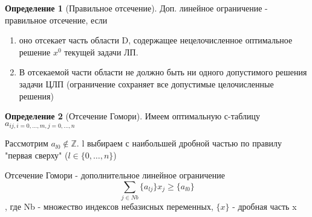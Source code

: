 \documentclass[a4paper]{article}
\theoremstyle{definition}
\newtheorem*{definition}{Определение}
\theoremstyle{remark}
\begin{document}
\begin{definition}[Правильное отсечение]
	Доп. линейное ограничение - правильное отсечение, если
	\begin{enumerate}
		\item оно отсекает часть области D, содержащее нецелочисленное оптимальное решение $x^0$ текущей задачи ЛП.
		\item В отсекаемой части области не должно быть ни одного допустимого решения задачи ЦЛП (ограничение сохраняет все допустимые целочисленные решения)
	\end{enumerate}
\end{definition}
\begin{definition}[Отсечение Гомори]
	Имеем оптимальную с-таблицу $a_{ij, i = 0, \dots, m, j = 0, \dots, n}$

	Рассмотрим $a_{l0}\notin \mathbb{Z}$. l выбираем с наибольшей дробной частью по правилу "первая сверху" ($l\in \{0, \dots, n\}$)

	Отсечение Гомори - дополнительное линейное ограничение
	\[\sum_{j\in Nb} \{a_{lj}\}x_j \geq \{a_{l0}\}\], где Nb - множество индексов небазисных переменных, $\{x\}$ - дробная часть x
\end{definition}
\end{document}
